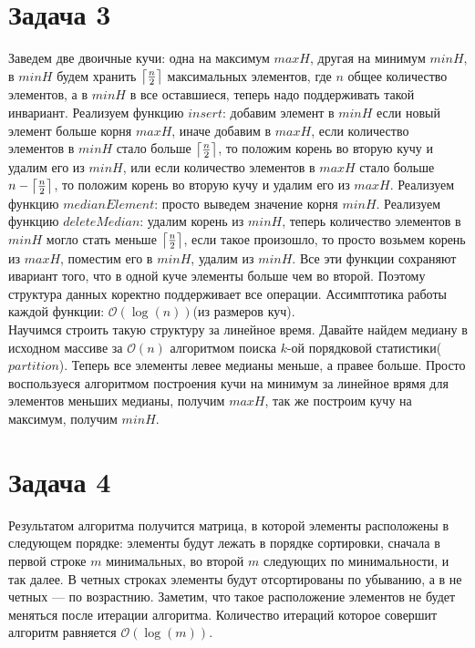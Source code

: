 \documentclass{article}
\DeclarePairedDelimiter{\ceil}{\lceil}{\rceil}
\begin{document}
	\section*{Задача 3}
	Заведем две двоичные кучи: одна на максимум $maxH$, другая на минимум $minH$, в $minH$ будем хранить $\ceil*{\frac{n}{2}}$ максимальных элементов, где $n$ общее количество элементов, а в $minH$ в все оставшиеся, теперь надо поддерживать такой инвариант. Реализуем функцию $insert$: добавим элемент в $minH$ если новый элемент больше корня $maxH$, иначе добавим в $maxH$, если количество элементов в $minH$ стало больше $\ceil*{\frac{n}{2}}$, то положим корень во вторую кучу и удалим его из $minH$, или если количество элементов в $maxH$ стало больше $n - \ceil*{\frac{n}{2}}$, то положим корень во вторую кучу и удалим его из $maxH$. Реализуем функцию $medianElement$: просто выведем значение корня $minH$. Реализуем функцию $deleteMedian$: удалим корень из $minH$, теперь количество элементов в $minH$ могло стать меньше $\ceil*{\frac{n}{2}}$, если такое произошло, то просто возьмем корень из $maxH$, поместим его в $minH$, удалим из $minH$. Все эти функции сохраняют ивариант того, что в одной куче элементы больше чем во второй. Поэтому структура данных коректно поддерживает все операции. Ассимптотика работы каждой функции: $\mathcal{O}(\log(n))$(из размеров куч).
	\\
	Научимся строить такую структуру за линейное время. Давайте найдем медиану в исходном массиве за $\mathcal{O}(n)$ алгоритмом поиска $k$-ой порядковой статистики($partition$). Теперь все элементы левее медианы меньше, а правее больше. Просто воспользуеся алгоритмом построения кучи на минимум за линейное врямя для элементов меньших медианы, получим $maxH$, так же построим кучу на максимум, получим $minH$.
	
	\section*{Задача 4}
	Результатом алгоритма получится матрица, в которой элементы расположены в следующем порядке: элементы будут лежать в порядке сортировки, сначала в первой строке $m$ минимальных, во второй $m$ следующих по минимальности, и так далее. В четных строках элементы будут отсортированы  по убыванию, а в не четных --- по возрастнию. Заметим, что такое расположение элементов не будет меняться после итерации алгоритма. Количество итераций которое совершит алгоритм равняется $\mathcal{O}(\log(m))$.
	
\end{document}
